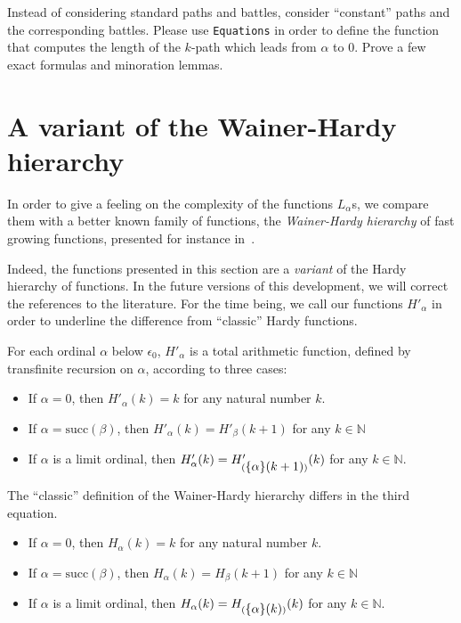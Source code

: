 \begin{project}
Instead of considering standard paths and battles, consider ``constant'' paths and the corresponding battles. Please use \texttt{Equations} in order to define the function that computes the length of the $k$-path which leads  from $\alpha$ to $0$.
Prove a few  exact formulas and minoration lemmas.
\end{project}

\section{A variant of the Wainer-Hardy hierarchy}

\label{sect:hardy}




In order to give a feeling on  the complexity of the functions  $L_\alpha$s, we compare them with a better known family of functions, the  \emph{Wainer-Hardy hierarchy} of fast growing functions,
presented for instance in~\cite{Promel2013}. 

\begin{remark}
  Indeed, the functions presented in this section are a \emph{variant} of the Hardy hierarchy of functions. In the future versions of this development, we will correct the references to the literature. For the time being, we call our functions $H'_\alpha$ in order to underline the difference from ``classic'' Hardy functions.
\end{remark}

For each ordinal $\alpha$ below $\epsilon_0$, $H'_\alpha$ is 
a total arithmetic function, defined  by  transfinite recursion on $\alpha$, according to three cases:


\begin{itemize}
\item If $\alpha=0$, then $H'_\alpha (k)= k$ for any natural number $k$.
\item If $\alpha=\textrm{succ}(\beta)$, then 
$H'_\alpha(k)=H'_\beta(k+1)$ for any $k \in \mathbb{N}$
\item If $\alpha$ is a limit ordinal, then 
$H'_\alpha(k) = H'_{(\mbox{$\{\alpha\}(k+1)$})}(k)$ for any $k\in \mathbb{N}$.
\end{itemize}

\begin{remark}
 The ``classic'' definition of the Wainer-Hardy hierarchy differs in the third equation.

\begin{itemize}
\item If $\alpha=0$, then $H_\alpha (k)= k$ for any natural number $k$.
\item If $\alpha=\textrm{succ}(\beta)$, then 
$H_\alpha(k)=H_\beta(k+1)$ for any $k \in \mathbb{N}$
\item If $\alpha$ is a limit ordinal, then 
$H_\alpha(k) = H_{(\mbox{$\{\alpha\}(k)$})}(k)$ for any $k\in \mathbb{N}$.
\end{itemize}

\end{remark}

